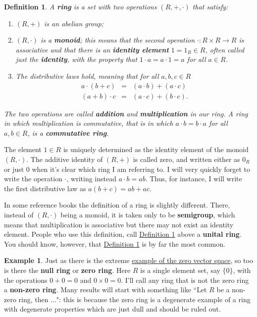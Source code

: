 \documentclass[11pt]{amsbook}
\newtheorem{definition}[theorem]{Definition}
\theoremstyle{definition}
\newtheorem{ex}[theorem]{Example}
\begin{document}
\begin{definition}
\label{ringdef}
A {\bf ring} is a set with two operations $(R,+, \cdot)$ that satisfy:
\begin{enumerate}
\item $(R,+)$ is an abelian group;
\item $(R,\cdot)$ is a {\bf monoid}; this means that the second operation $\cdot : R\times R \to R$ is associative and that there is an {\bf identity element} $1 = 1_R \in R$, often called just the {\bf identity}, with the property that $1\cdot a = a\cdot 1 = a$ for all $a\in R$.
\item The distributive laws hold, meaning that for all $a,b,c\in R$ \begin{eqnarray*} a\cdot (b+c) &=& (a\cdot b) + (a\cdot c) \\ (a+b)\cdot c & = & (a\cdot c) + (b\cdot c).\end{eqnarray*}
\end{enumerate}
The two operations are called {\bf addition} and {\bf multiplication} in our ring. A ring in which  multiplication is commutative, that is in which $a\cdot b = b\cdot a$ for all $a,b \in R$, is a {\bf commutative ring}.
\end{definition}
The element $1\in R$ is uniquely determined as the identity element of the monoid $(R, \cdot)$. The additive identity of $(R,+)$ is called zero, and written either as $0_R$ or just $0$ when it's clear which ring I am referring to. I will very quickly forget to write the operation $\cdot$, writing instead $a\cdot b = ab$. Thus, for instance, I will write the first distributive law as $a(b+c) = ab + ac$.

In some reference books the definition of a ring is slightly different. There, instead of $(R,\cdot)$ being a monoid, it is taken only to be {\bf semigroup}, which means that multiplication is associative but there may not exist an identity element. People who use this definition, call \hyperref[ringdef]{Definition \ref{ringdef}} above a {\bf unital ring}. You should know, however, that \hyperref[ringdef]{Definition \ref{ringdef}} is by far the most common.

\begin{ex}
Just as there is the extreme \hyperref[zerovs1]{example of the zero vector space}, so too is there the {\bf null ring} or {\bf zero ring}. Here $R$ is a single element set, say $\{ 0 \}$, with the operations $0 + 0 = 0$ and $0\times 0 = 0$. I'll call any ring that is not the zero ring a {\bf non-zero ring}. Many results will start with something like ``Let $R$ be a non-zero ring, then ...": this is because the zero ring is a degenerate example of a ring with degenerate properties which are just dull and should be ruled out.
\end{ex}
\end{document}
